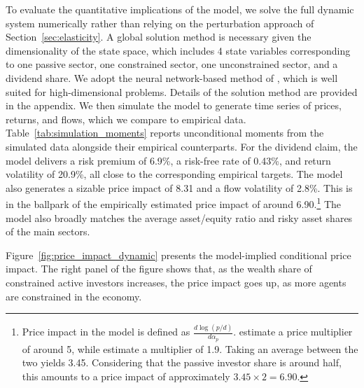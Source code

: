 \documentclass[12pt,english]{article}
\begin{document}
To evaluate the quantitative implications of the model, we solve the full dynamic system numerically rather than relying on the perturbation approach of Section~\ref{sec:elasticity}. A global solution method is necessary given the dimensionality of the state space, which includes 4 state variables corresponding to one passive sector, one constrained sector, one unconstrained sector, and a dividend share. We adopt the neural network-based method of \citet{duarte2024machine}, which is well suited for high-dimensional problems. Details of the solution method are provided in the appendix. We then simulate the model to generate time series of prices, returns, and flows, which we compare to empirical data. Table~\ref{tab:simulation_moments} reports unconditional moments from the simulated data alongside their empirical counterparts. For the dividend claim, the model delivers a risk premium of 6.9\%, a risk-free rate of 0.43\%, and return volatility of 20.9\%, all close to the corresponding empirical targets. The model also generates a sizable price impact of 8.31 and a flow volatility of 2.8\%. 
This is in the ballpark of the empirically estimated price impact of around 6.90.\footnote{Price impact in the model is defined as $\frac{d\log(p/d)}{d\alpha_p}$. \citet{gabaix2020search} estimate a price multiplier of around 5, while \citet{Hartzmark/Solomon/2021} estimate a multiplier of 1.9. Taking an average between the two yields 3.45. Considering that the passive investor share is around half, this amounts to a price impact of approximately $3.45 \times 2 = 6.90$.} The model also broadly matches the average asset/equity ratio and risky asset shares of the main sectors.

\begin{table}[!t]    
    \centering%
	\resizebox{.8\linewidth}{!}{}
    \vspace{2mm}
    \captionsetup{type=table,font=footnotesize,justification=centering,singlelinecheck=false}
    \caption{\textbf{Simulation results.}\\This table reports the model-implied and empirical moments. All values are annualized.}\label{tab:simulation_moments} 
\end{table}

Figure~\ref{fig:price_impact_dynamic} presents the model-implied conditional price impact. The right panel of the figure shows that, as the wealth share of constrained active investors increases, the price impact goes up, as more agents are constrained in the economy. 
\end{document}
